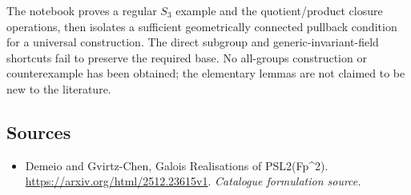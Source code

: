 \documentclass[11pt,a4paper]{article}
\numberwithin{equation}{section}
\begin{document}
The notebook proves a regular $S_3$ example and the quotient/product
closure operations, then isolates a sufficient geometrically connected
pullback condition for a universal construction.  The direct subgroup
and generic-invariant-field shortcuts fail to preserve the required
base.  No all-groups construction or counterexample has been obtained;
the elementary lemmas are not claimed to be new to the literature.
\subsection{Sources}
\begin{itemize}\raggedright
\item[\textnormal{[S1]}]\hypertarget{source:statement:1}{} Demeio and Gvirtz-Chen, Galois Realisations of PSL2(Fp\textasciicircum{}2).
\url{https://arxiv.org/html/2512.23615v1}.
{\small\textit{Catalogue formulation source.}}
\end{itemize}
\end{document}
